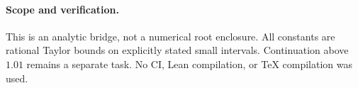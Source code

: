 \documentclass[11pt]{article}
\begin{document}
\paragraph{Scope and verification.}
This is an analytic bridge, not a numerical root enclosure. All constants are rational Taylor bounds on explicitly stated small intervals. Continuation above $1.01$ remains a separate task. No CI, Lean compilation, or TeX compilation was used.
\end{document}
